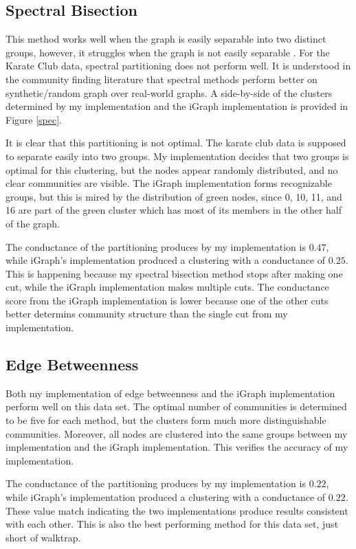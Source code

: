 \documentclass{article}
\begin{document}
    \subsection{Spectral Bisection}
    This method works well when the graph is easily separable into two distinct groups, however, it struggles when the graph is not easily separable \cite{Newman2004}. For the Karate Club data, spectral partitioning does not perform well. It is understood in the community finding literature that spectral methods perform better on synthetic/random graph over real-world graphs. A side-by-side of the clusters determined by my implementation and the iGraph implementation is provided in Figure \ref{spec}.
    \par
    It is clear that this partitioning is not optimal. The karate club data is supposed to separate easily into two groups. My implementation decides that two groups is optimal for this clustering, but the nodes appear randomly distributed, and no clear communities are visible. The iGraph implementation forms recognizable groups, but this is mired by the distribution of green nodes, since 0, 10, 11, and 16 are part of the green cluster which has most of its members in the other half of the graph.
    \par
    The conductance of the partitioning produces by my implementation is $0.47$, while iGraph's implementation produced a clustering with a conductance of $0.25$. This is happening because my spectral bisection method stops after making one cut, while the iGraph implementation makes multiple cuts. The conductance score from the iGraph implementation is lower because one of the other cuts better determins community structure than the single cut from my implementation.

    \subsection{Edge Betweenness}
    Both my implementation of edge betweenness and the iGraph implementation perform well on this data set. The optimal number of communities is determined to be five for each method, but the clusters form much more distinguishable communities. Moreover, all nodes are clustered into the same groups between my implementation and the iGraph implementation. This verifies the accuracy of my implementation.
    \par
    The conductance of the partitioning produces by my implementation is $0.22$, while iGraph's implementation produced a clustering with a conductance of $0.22$. These value match indicating the two implementations produce results consistent with each other. This is also the best performing method for this data set, just short of walktrap.
\end{document}
